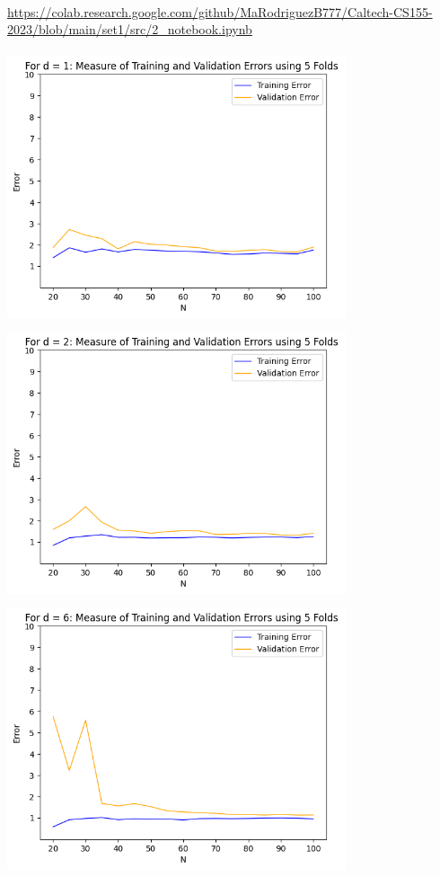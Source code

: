 \begin{solution}
  \\
  \url{https://colab.research.google.com/github/MaRodriguezB777/Caltech-CS155-2023/blob/main/set1/src/2_notebook.ipynb} \\
  \graphicspath{{images/}}
  \includegraphics[width=10cm, height=8cm]{Problem_2_d=1.png}\\
  \includegraphics[width=10cm, height=8cm]{Problem_2_d=2.png}\\
  \includegraphics[width=10cm, height=8cm]{Problem_2_d=6.png}\\

\end{solution}
